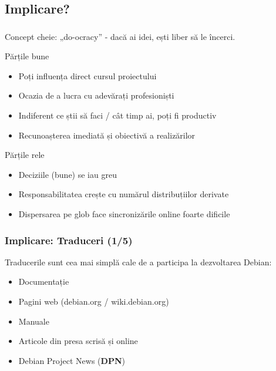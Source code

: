 \documentclass[xcolor=dvipsnames]{beamer}
\begin{document}
\subsection{Implicare?}
\begin{frame}
\frametitle{}
\begin{small}
Concept cheie: „do-ocracy” - dacă ai idei, ești liber să le încerci.
\end{small}
\begin{block}
{Părțile bune}
\begin{itemize}
\item Poți influența direct cursul proiectului
\item Ocazia de a lucra cu adevărați profesioniști
\item Indiferent ce știi să faci / cât timp ai, poți fi productiv
\item Recunoașterea imediată și obiectivă a realizărilor
\end{itemize}
\end{block}
\begin{block}
{Părțile rele}
\begin{itemize}
\item Deciziile (bune) se iau greu
\item Responsabilitatea crește cu numărul distribuțiilor derivate
\item Dispersarea pe glob face sincronizările online foarte dificile
\end{itemize}
\end{block}
\end{frame}

\begin{frame}
\frametitle{Implicare: Traduceri (1/5)}
\begin{block}{}
Traducerile sunt cea mai simplă cale de a participa la dezvoltarea Debian:\\
\begin{itemize}
\item Documentație
\item Pagini web (debian.org / wiki.debian.org)
\item Manuale
\item Articole din presa scrisă și online
\item Debian Project News (\textbf{DPN})
\end{itemize}
\end{block}
\end{frame}
\end{document}
